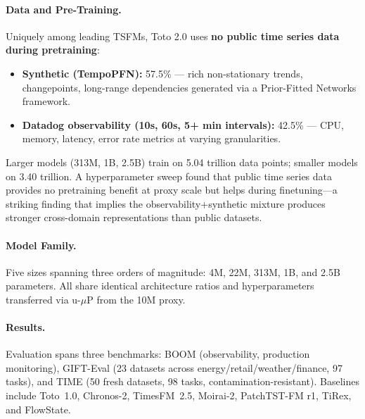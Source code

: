 \documentclass[11pt,a4paper]{article}
\begin{document}
\paragraph{Data and Pre-Training.}
Uniquely among leading TSFMs, Toto 2.0 uses \textbf{no public time series data during pretraining}:
\begin{itemize}[nosep]
    \item \textbf{Synthetic (TempoPFN):} 57.5\% --- rich non-stationary trends, changepoints, long-range dependencies generated via a Prior-Fitted Networks framework.
    \item \textbf{Datadog observability (10s, 60s, 5+ min intervals):} 42.5\% --- CPU, memory, latency, error rate metrics at varying granularities.
\end{itemize}
Larger models (313M, 1B, 2.5B) train on 5.04 trillion data points; smaller models on 3.40 trillion. A hyperparameter sweep found that public time series data provides no pretraining benefit at proxy scale but helps during finetuning---a striking finding that implies the observability+synthetic mixture produces stronger cross-domain representations than public datasets.

\paragraph{Model Family.}
Five sizes spanning three orders of magnitude: 4M, 22M, 313M, 1B, and 2.5B parameters. All share identical architecture ratios and hyperparameters transferred via u-$\mu$P from the 10M proxy.

\paragraph{Results.}
Evaluation spans three benchmarks: BOOM (observability, production monitoring), GIFT-Eval (23 datasets across energy/retail/weather/finance, 97 tasks), and TIME (50 fresh datasets, 98 tasks, contamination-resistant). Baselines include Toto~1.0, Chronos-2, TimesFM~2.5, Moirai-2, PatchTST-FM r1, TiRex, and FlowState.
\end{document}
